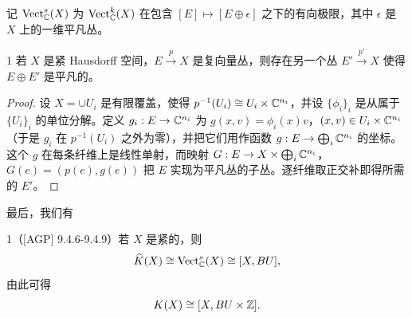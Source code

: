 记 $\mathrm{Vect}^s_{\mathbb{C}}(X)$ 为 $\mathrm{Vect}^k_{\mathbb{C}}(X)$ 在包含 $[E]\mapsto [E\oplus\epsilon]$ 之下的有向极限，其中 $\epsilon$ 是 $X$ 上的一维平凡丛。


\begin{lem}{1} 若 $X$ 是紧 Hausdorff 空间，$E\xrightarrow{p} X$ 是复向量丛，则存在另一个丛 $E'\xrightarrow{p'} X$ 使得 $E\oplus E'$ 是平凡的。\end{lem}

\begin{proof}
设 $X = \cup U_i$ 是有限覆盖，使得 $p^{-1}(U_i)\cong U_i\times\mathbb{C}^{n_i}$，并设 $\{\phi_i\}_i$ 是从属于 $\{U_i\}_i$ 的单位分解。定义 $g_i: E\to\mathbb{C}^{n_i}$ 为 $g(x,v) = \phi_i(x)v$，$(x,v)\in U_i\times\mathbb{C}^{n_i}$（于是 $g_i$ 在 $p^{-1}(U_i)$ 之外为零），并把它们用作函数 $g: E\to\bigoplus_i \mathbb{C}^{n_i}$ 的坐标。这个 $g$ 在每条纤维上是线性单射，而映射 $G: E\to X\times\bigoplus_i\mathbb{C}^{n_i}$，$G(e) = (p(e), g(e))$ 把 $E$ 实现为平凡丛的子丛。逐纤维取正交补即得所需的 $E'$。
\end{proof}


最后，我们有

\begin{thm}{1}（[AGP] 9.4.6-9.4.9）若 $X$ 是紧的，则
\[ \widehat K(X)\cong \mathrm{Vect}^s_{\mathbb{C}}(X)\cong [X, BU], \]
由此可得
\[ K(X)\cong [X, BU\times\mathbb{Z}]. \]
\end{thm}

